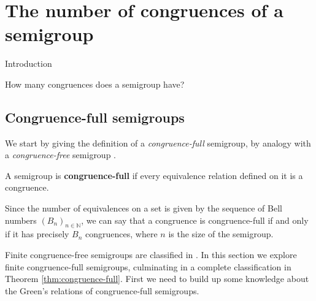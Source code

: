 \chapter{The number of congruences of a semigroup}
\label{chap:nrcongs}

Introduction

How many congruences does a semigroup have? %

\section{Congruence-full semigroups}

We start by giving the definition of a \textit{congruence-full} semigroup, by
analogy with a \textit{congruence-free} semigroup \cite[3.7]{howie}.

\begin{definition}
  A semigroup is \textbf{congruence-full} if every equivalence relation defined
  on it is a congruence.
\end{definition}

Since the number of equivalences on a set is given by the sequence of Bell
numbers $(B_n)_{n \in \mathbb{N}}$, we can say that a congruence is
congruence-full if and only if it has precisely $B_n$ congruences, where $n$ is
the size of the semigroup.

Finite congruence-free semigroups are classified in \cite[3.7]{howie}.
In this section we explore finite congruence-full semigroups, culminating in a
complete classification in Theorem \ref{thm:congruence-full}.  First we need to
build up some knowledge about the Green's relations of congruence-full
semigroups.

